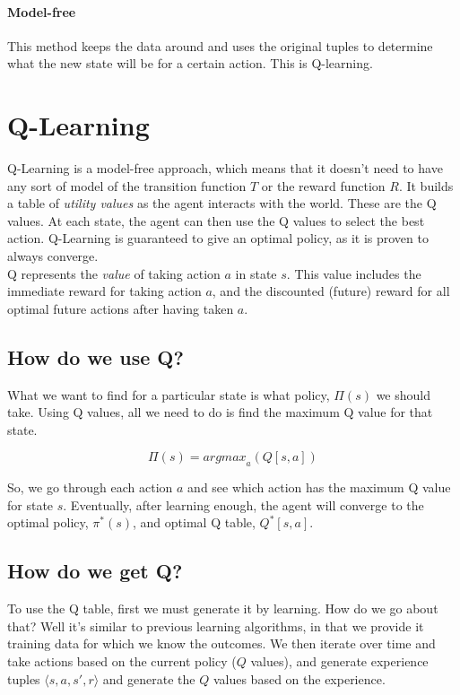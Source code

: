 \paragraph{Model-free} This method keeps the data around and uses the original tuples to determine what the new state will be for a certain action. This is Q-learning.

\section{Q-Learning}

\noindent Q-Learning is a model-free approach, which means that it doesn't need to have any sort of model of the transition function $T$ or the reward function $R$. It builds a table of \textit{utility values} as the agent interacts with the world. These are the Q values. At each state, the agent can then use the Q values to select the best action. Q-Learning is guaranteed to give an optimal policy, as it is proven to always converge.\\

\noindent Q represents the \textit{value} of taking action $a$ in state $s$. This value includes the immediate reward for taking action $a$, and the discounted (future) reward for all optimal future actions after having taken $a$. \\

\subsection{How do we use Q?}
\noindent What we want to find for a particular state is what policy, $\Pi(s)$ we should take. Using Q values, all we need to do is find the maximum Q value for that state.

\begin{equation}
\Pi(s) = {argmax}_{a}(Q[s,a])
\end{equation}

\noindent So, we go through each action $a$ and see which action has the maximum Q value for state $s$. Eventually, after learning enough, the agent will converge to the optimal policy, $\pi^*(s)$, and optimal Q table, $Q^*[s,a]$.

\subsection{How do we get Q?}
\noindent To use the Q table, first we must generate it by learning. How do we go about that? Well it's similar to previous learning algorithms, in that we provide it training data for which we know the outcomes. We then iterate over time and take actions based on the current policy ($Q$ values), and generate experience tuples $\langle s,a,s',r\rangle$ and generate the $Q$ values based on the experience.\par

